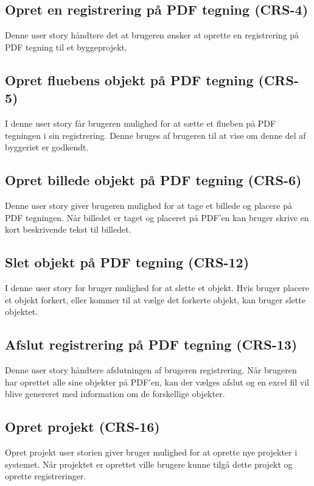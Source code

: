 	\subsection*{Opret en registrering på PDF tegning (CRS-4)}
	Denne user story håndtere det at brugeren ønsker at oprette en registrering på PDF tegning til et byggeprojekt.
	
	\subsection*{Opret fluebens objekt på PDF tegning (CRS-5)}
	I denne user story får brugeren mulighed for at sætte et flueben på PDF tegningen i sin registrering. Denne bruges af brugeren til at vise om denne del af byggeriet er godkendt.

	\subsection*{Opret billede objekt på PDF tegning (CRS-6)}
	Denne user story giver brugeren mulighed for at tage et billede og placere på PDF tegningen. Når billedet er taget og placeret på PDF'en kan bruger skrive en kort beskrivende tekst til billedet.
		
	\subsection*{Slet objekt på PDF tegning (CRS-12)}
	I denne user story for bruger mulighed for at slette et objekt. Hvis bruger placere et objekt forkert, eller kommer til at vælge det forkerte objekt, kan bruger slette objektet. 

	\subsection*{Afslut registrering på PDF tegning (CRS-13)}
	Denne user story håndtere afslutningen af brugeren registrering. Når brugeren har oprettet alle sine objekter på PDF'en, kan der vælges afslut og en excel fil vil blive genereret med information om de forskellige objekter.
	
	\subsection*{Opret projekt (CRS-16)}
	Opret projekt user storien giver bruger mulighed for at oprette nye projekter i systemet. Når projektet er oprettet ville brugere kunne tilgå dette projekt og oprette registreringer. \\
	

